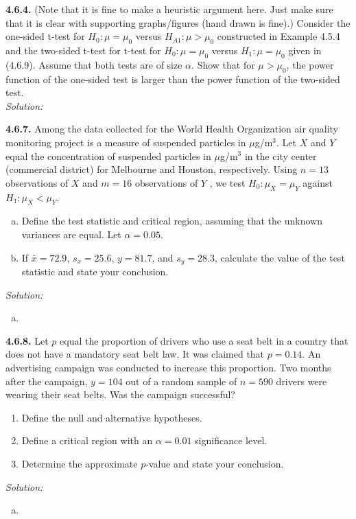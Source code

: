 \documentclass{book}
\theoremstyle{definition}
\newcommand{\al}{\alpha}
\begin{document}
\newpage
\noindent \textbf{4.6.4.} (Note that it is fine to make a heuristic argument here. Just make sure that it is clear with
supporting graphs/figures (hand drawn is fine).) Consider the one-sided t-test for $H_0 : \mu = \mu_0$ versus $H_{A1} : \mu>\mu_0$ constructed in Example 4.5.4 and the two-sided t-test for t-test for $H_0 : \mu = \mu_0$ versus
$H_1 : \mu = \mu_0$ given in (4.6.9). Assume that both tests are of size $\alpha$. Show that for
$\mu>\mu_0$, the power function of the one-sided test is larger than the power function of the two-sided test.\\


\noindent \textit{Solution:} 



\newpage
\textbf{4.6.7.} Among the data collected for the World Health Organization air quality
monitoring project is a measure of suspended particles in $\mu$g/m$^3$. Let $X$ and $Y$ equal
the concentration of suspended particles in $\mu$g/m$^3$ in the city center (commercial
district) for Melbourne and Houston, respectively. Using $n = 13$ observations of $X$
and $m = 16$ observations of $Y$ , we test $H_0 : \mu_X = \mu_Y$ against $H_1 : \mu_X < \mu_Y$.

\begin{enumerate}[(a)]
	\item Define the test statistic and critical region, assuming that the unknown variances are equal. Let $\al = 0.05$.
	\item If $\bar{x} = 72.9$, $s_x = 25.6$, $y = 81.7$, and $s_y = 28.3$, calculate the value of the
	test statistic and state your conclusion.
\end{enumerate}


\noindent \textit{Solution:}
\begin{enumerate}[(a)]
	\item 
\end{enumerate}

\newpage
\textbf{4.6.8.} Let $p$ equal the proportion of drivers who use a seat belt in a country that
does not have a mandatory seat belt law. It was claimed that $p = 0.14$. An
advertising campaign was conducted to increase this proportion. Two months after
the campaign, $y = 104$ out of a random sample of $n = 590$ drivers were wearing
their seat belts. Was the campaign successful?
\begin{enumerate}
	\item Define the null and alternative hypotheses.
	\item Define a critical region with an $\al = 0.01$ significance level.
	\item Determine the approximate $p$-value and state your conclusion.
\end{enumerate}


\noindent \textit{Solution:}
\begin{enumerate}[(a)]
	\item 
\end{enumerate}




\newpage







	
	
\end{document}
